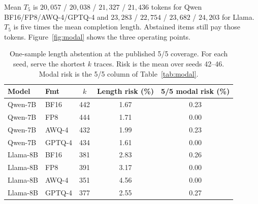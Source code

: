 \documentclass[11pt,a4paper]{article}
\begin{document}
Mean $T_5$ is $20{,}057$ / $20{,}038$ / $21{,}327$ / $21{,}436$ tokens for Qwen BF16/FP8/AWQ-4/GPTQ-4 and $23{,}283$ / $22{,}754$ / $23{,}682$ / $24{,}203$ for Llama. $T_5$ is five times the mean completion length. Abstained items still pay those tokens. Figure~\ref{fig:modal} shows the three operating points.

\begin{table}[t]
\centering
\caption{One-sample length abstention at the published 5/5 coverage. For each seed, serve the shortest $k$ traces. Risk is the mean over seeds 42--46. Modal risk is the 5/5 column of Table~\ref{tab:modal}.}
\label{tab:length-abstain}
\small
\begin{tabular}{llccc}
\toprule
\textbf{Model} & \textbf{Fmt} & $k$ & \textbf{Length risk (\%)} & \textbf{5/5 modal risk (\%)} \\
\midrule
Qwen-7B & BF16 & 442 & 1.67 & 0.23 \\
Qwen-7B & FP8 & 444 & 1.71 & 0.00 \\
Qwen-7B & AWQ-4 & 432 & 1.99 & 0.23 \\
Qwen-7B & GPTQ-4 & 434 & 1.61 & 0.00 \\
Llama-8B & BF16 & 381 & 2.83 & 0.26 \\
Llama-8B & FP8 & 391 & 3.17 & 0.00 \\
Llama-8B & AWQ-4 & 351 & 4.56 & 0.00 \\
Llama-8B & GPTQ-4 & 377 & 2.55 & 0.27 \\
\bottomrule
\end{tabular}
\end{table}
\end{document}
